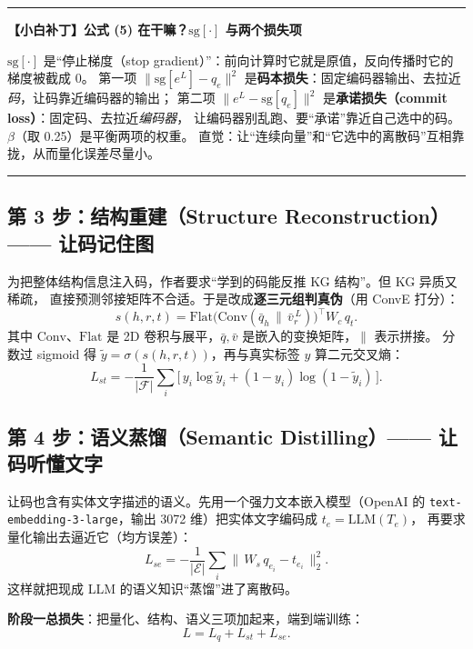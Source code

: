 \documentclass[11pt,UTF8,fontset=fandol]{ctexart}
\newenvironment{tip}[1]{%
  \par\smallskip\noindent\rule{\linewidth}{0.4pt}\par\nobreak
  \noindent\textbf{【小白补丁】#1}\par\nobreak\noindent\ignorespaces
}{%
  \par\noindent\rule{\linewidth}{0.4pt}\par\smallskip
}
\begin{document}
\begin{tip}{公式 (5) 在干嘛？$\mathrm{sg}[\cdot]$ 与两个损失项}
$\mathrm{sg}[\cdot]$ 是“停止梯度（stop gradient）”：前向计算时它就是原值，反向传播时它的梯度被截成 0。
第一项 $\|\mathrm{sg}[e^L]-q_e\|^2$ 是\textbf{码本损失}：固定编码器输出、去拉近\emph{码}，让码靠近编码器的输出；
第二项 $\|e^L-\mathrm{sg}[q_e]\|^2$ 是\textbf{承诺损失（commit loss）}：固定码、去拉近\emph{编码器}，
让编码器别乱跑、要“承诺”靠近自己选中的码。$\beta$（取 0.25）是平衡两项的权重。
直觉：让“连续向量”和“它选中的离散码”互相靠拢，从而量化误差尽量小。
\end{tip}

\subsection{第 3 步：结构重建（Structure Reconstruction）—— 让码记住图}
为把整体结构信息注入码，作者要求“学到的码能反推 KG 结构”。但 KG 异质又稀疏，
直接预测邻接矩阵不合适。于是改成\textbf{逐三元组判真伪}（用 ConvE 打分）：
\begin{equation*}
  s(h,r,t)=\mathrm{Flat}\big(\mathrm{Conv}(\bar q_h\,\|\,\bar v_r^{\,L})\big)^{\!\top}W_c\,q_t.\tag{6}
\end{equation*}
其中 $\mathrm{Conv}$、$\mathrm{Flat}$ 是 2D 卷积与展平，$\bar q,\bar v$ 是嵌入的变换矩阵，$\|$ 表示拼接。
分数过 sigmoid 得 $\tilde y=\sigma(s(h,r,t))$，再与真实标签 $y$ 算二元交叉熵：
\begin{equation*}
  L_{st}=-\frac{1}{|\mathcal{F}|}\sum_i\big[\,y_i\log\tilde y_i+(1-y_i)\log(1-\tilde y_i)\,\big].\tag{7}
\end{equation*}

\subsection{第 4 步：语义蒸馏（Semantic Distilling）—— 让码听懂文字}
让码也含有实体文字描述的语义。先用一个强力文本嵌入模型（OpenAI 的
\texttt{text-embedding-3-large}，输出 3072 维）把实体文字编码成 $t_e=\mathrm{LLM}(T_e)$，
再要求量化输出去逼近它（均方误差）：
\begin{equation*}
  L_{se}=-\frac{1}{|\mathcal{E}|}\sum_i\big\|\,W_s\,q_{e_i}-t_{e_i}\,\big\|_2^2.\tag{8}
\end{equation*}
这样就把现成 LLM 的语义知识“蒸馏”进了离散码。

\textbf{阶段一总损失}：把量化、结构、语义三项加起来，端到端训练：
\begin{equation*}
  L=L_q+L_{st}+L_{se}.\tag{9}
\end{equation*}
\end{document}
